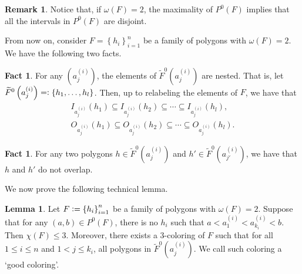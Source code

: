 \documentclass[12pt]{article}
\theoremstyle{definition}
\newtheorem{lemma}[thm]{Lemma}
\newtheorem{rmk}[thm]{Remark}
\newtheorem{fact}[thm]{Fact}
\newcommand{\defeq}{\vcentcolon=}
\newcommand{\eqdef}{=\vcentcolon}
\begin{document}
     \begin{rmk}
         Notice that, if 
         $\omega\left(F\right) = 2$,
         the maximality of
         $P^{0}\left(F\right)$ 
         implies that all the
         intervals in $P^{0}\left(F\right)$
         are disjoint.
     \end{rmk}

     From now on, consider
     $F = \left\{h_{i}\right\}_{i = 1}^{n}$ 
     be a family of polygons
     with $\omega\left(F\right)=2$.
     We have the following two facts.

     \begin{fact}
         For any $\left(a_{j}^{\left(i\right)}\right)$,
         the elements of
         $\widetilde{F}^{0}\left(a_{j}^{\left(i\right)}\right)$ 
         are nested. That is, let
             $\widetilde{F}^{0}\left(a_{j}^{\left(i\right)}\right) 
             \eqdef \left\{h_1, \ldots, h_{l}\right\}$.
         Then, up to relabeling
         the elements of $F$, we have that
         \begin{gather*}
             I_{a_{j}^{\left(i\right)}}\left(h_1\right)
             \subseteq I_{a_{j}^{\left(i\right)}}\left(h_2\right)
             \subseteq \cdots
             \subseteq I_{a_{j}^{\left(i\right)}}\left(h_{l}\right), \\
             O_{a_{j}^{\left(i\right)}}\left(h_1\right)
             \subseteq O_{a_{j}^{\left(i\right)}}\left(h_2\right)
             \subseteq \cdots
             \subseteq O_{a_{j}^{\left(i\right)}}\left(h_{l}\right).
         \end{gather*}
     \end{fact}
     
     \begin{fact}
         For any two polygons
         $h \in \widetilde{F}^{0}\left(a_{j}^{\left(i\right)}\right)$ 
         and 
         $h' \in \widetilde{F}^{0}\left(a_{j'}^{\left(i\right)}\right)$, 
         we have that $h$ and $h'$
         do not overlap.    
     \end{fact}

     We now prove the following
     technical lemma.

     \begin{lemma} \label{lemma:poly}
         Let $F \defeq \left\{h_{i}\right\}_{i =1}^{n}$ 
         be a family of polygons with
         $\omega\left(F\right) = 2$.
         Suppose that for any
         $\left(a, b\right) \in P^{0}\left(F\right)$,
         there is no $h_{i}$ such
         that $a < a_1^{\left(i\right)}
         < a_{k_{i}}^{\left(i\right)} < b$.
         Then $\chi\left(F\right) \leq 3$.
         Moreover, there exists
         a 3-coloring of $F$ such
         that for all $1 \leq i \leq n$
         and $1 < j \leq k_{i}$,
         all polygons in
         $\widetilde{F}^{0}\left(a_{j}^{\left(i\right)}\right)$.
         We call such coloring a
         `good coloring'.
     \end{lemma}
\end{document}
